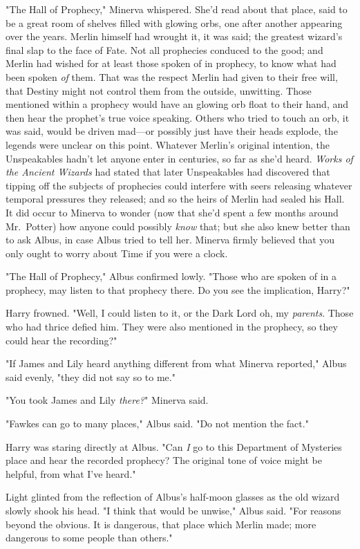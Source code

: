 "The Hall of Prophecy," Minerva whispered. She'd read about that place, said to
be a great room of shelves filled with glowing orbs, one after another
appearing over the years. Merlin himself had wrought it, it was said; the
greatest wizard's final slap to the face of Fate. Not all prophecies conduced
to the good; and Merlin had wished for at least those spoken of in prophecy, to
know what had been spoken \emph{of} them. That was the respect Merlin had given
to their free will, that Destiny might not control them from the outside,
unwitting. Those mentioned within a prophecy would have an glowing orb float to
their hand, and then hear the prophet's true voice speaking. Others who tried
to touch an orb, it was said, would be driven mad—or possibly just have their
heads explode, the legends were unclear on this point. Whatever Merlin's
original intention, the Unspeakables hadn't let anyone enter in centuries, so
far as she'd heard. \emph{Works of the Ancient Wizards} had stated that later
Unspeakables had discovered that tipping off the subjects of prophecies could
interfere with seers releasing whatever temporal pressures they released; and
so the heirs of Merlin had sealed his Hall. It did occur to Minerva to wonder
(now that she'd spent a few months around Mr.~Potter) how anyone could possibly
\emph{know} that; but she also knew better than to ask Albus, in case Albus
tried to tell her. Minerva firmly believed that you only ought to worry about
Time if you were a clock.

"The Hall of Prophecy," Albus confirmed lowly. "Those who are spoken of in a
prophecy, may listen to that prophecy there. Do you see the implication, Harry?"

Harry frowned. "Well, I could listen to it, or the Dark Lord{\el} oh, my
\emph{parents}. Those who had thrice defied him. They were also mentioned in
the prophecy, so they could hear the recording?"

"If James and Lily heard anything different from what Minerva reported," Albus
said evenly, "they did not say so to me."

"You took James and Lily \emph{there?}" Minerva said.

"Fawkes can go to many places," Albus said. "Do not mention the fact."

Harry was staring directly at Albus. "Can \emph{I} go to this Department of
Mysteries place and hear the recorded prophecy? The original tone of voice
might be helpful, from what I've heard."

Light glinted from the reflection of Albus's half-moon glasses as the old
wizard slowly shook his head. "I think that would be unwise," Albus said. "For
reasons beyond the obvious. It is dangerous, that place which Merlin made; more
dangerous to some people than others."

